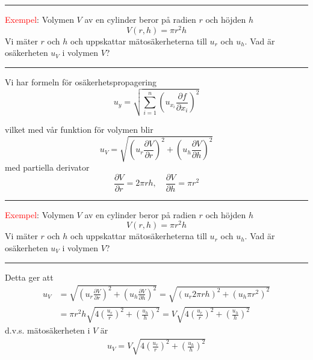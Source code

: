 \documentclass[9pt]{beamer}
\begin{document}
    \begin{frame}
        \hrule
        \vspace{0.1cm}
        \textcolor{red}{Exempel}: 
        Volymen $V$ av en cylinder beror på radien $r$ och höjden $h$
        \begin{equation*}
            V(r, h) = \pi r^2 h
        \end{equation*}
        Vi mäter $r$ och $h$ och uppskattar mätosäkerheterna till $u_r$ och $u_h$. Vad är osäkerheten $u_V$ i volymen $V$?
        \vspace{0.1cm}
        \hrule
        \vspace{0.2cm}
        Vi har formeln för osäkerhetspropagering
        \begin{equation*}
            u_y = \sqrt{\sum_{i=1}^n\left(u_{x_i}\frac{\partial f}{\partial x_i}\right)^2}
        \end{equation*}
        
        vilket med vår funktion för volymen blir
        \begin{equation*}
            u_V = \sqrt{\left(u_r\frac{\partial V}{\partial r}\right)^2 + \left(u_h\frac{\partial V}{\partial h}\right)^2}
        \end{equation*}
        \pause
        med partiella derivator
        \begin{equation*}
            \frac{\partial V}{\partial r} = 2\pi r h, \quad \frac{\partial V}{\partial h} = \pi r^2
        \end{equation*}

    \end{frame}
    
    \begin{frame}
        \hrule
        \vspace{0.1cm}
        \textcolor{red}{Exempel}: 
        Volymen $V$ av en cylinder beror på radien $r$ och höjden $h$
        \begin{equation*}
            V(r, h) = \pi r^2 h
        \end{equation*}
        Vi mäter $r$ och $h$ och uppskattar mätosäkerheterna till $u_r$ och $u_h$. Vad är osäkerheten $u_V$ i volymen $V$?
        \vspace{0.1cm}
        \hrule
        \vspace{0.2cm}
        Detta ger att
        \begin{align*}
            u_V &= \sqrt{\left(u_r\frac{\partial V}{\partial r}\right)^2 + \left(u_h\frac{\partial V}{\partial h}\right)^2} =
            \sqrt{(u_r 2\pi r h)^2 + (u_h \pi r^2)^2} \\
            &= \pi r^2 h \sqrt{4\left(\frac{u_r}{r}\right)^2 + \left(\frac{u_h}{h}\right)^2}
            = V \sqrt{4\left(\frac{u_r}{r}\right)^2 + \left(\frac{u_h}{h}\right)^2}
        \end{align*}
        d.v.s. mätosäkerheten i $V$ är
        \begin{align*}
            u_V = V\sqrt{4\left(\frac{u_r}{r}\right)^2 + \left(\frac{u_h}{h}\right)^2}
        \end{align*}
    \end{frame}
    
\end{document}

